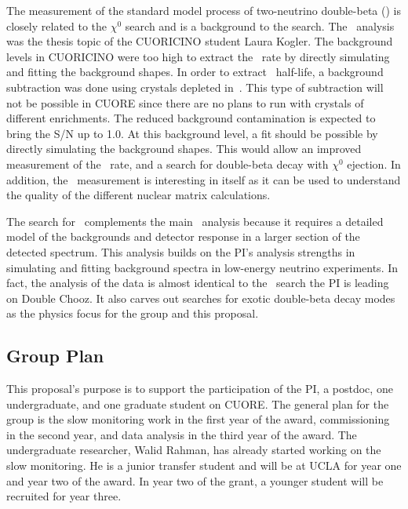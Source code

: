 The measurement of the standard model process of two-neutrino double-beta (\twonu) is closely related to the $\chi^{0}$ search and is a background to the search. The \twonu~analysis was the thesis topic of the CUORICINO student Laura Kogler\cite{laura}. The background levels in CUORICINO were too high to extract the \twonu~rate by directly simulating and fitting the background shapes. In order to extract \twonu~half-life, a background subtraction was done using crystals depleted in~\isomain. This type of subtraction will not be possible in CUORE since there are no plans to run with crystals of different enrichments. The reduced background contamination is expected to bring the S/N up to 1.0. At this background level, a fit should be possible by directly simulating the background shapes. This would allow an improved measurement of the \twonu~rate, and a search for double-beta decay with $\chi^{0}$ ejection. In addition, the \twonu~measurement is interesting in itself as it can be used to understand the quality of the different nuclear matrix calculations. 

The search for \maj~complements the main \zeronu~analysis because it requires a detailed model of the backgrounds and detector response in a larger section of the detected spectrum. This analysis builds on the PI's analysis strengths in simulating and fitting background spectra in low-energy neutrino experiments. In fact, the analysis of the data is almost identical to the \zeronu~search the PI is leading on Double Chooz. It also carves out searches for exotic double-beta decay modes as the physics focus for the group and this proposal.


\subsection{Group Plan}
This proposal's purpose is to support the participation of the PI, a postdoc, one undergraduate, and one graduate student on CUORE. The general plan for the group is the slow monitoring work in the first year of the award, commissioning in the second year, and data analysis in the third year of the award. The undergraduate researcher, Walid Rahman, has already started working on the slow monitoring. He is a junior transfer student and will be at UCLA for year one and year two of the award. In year two of the grant, a younger student will be recruited for year three. 


